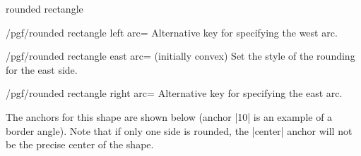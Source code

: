 \begin{shape}{rounded rectangle}
\begin{stylekey}{/pgf/rounded rectangle left arc=}
	Alternative key for specifying the west arc.
\end{stylekey}

\begin{key}{/pgf/rounded rectangle east arc= (initially convex)}
	Set the style of the rounding for the east side.
\end{key}

\begin{stylekey}{/pgf/rounded rectangle right arc=}
	Alternative key for specifying the east arc.
\end{stylekey}

	The anchors for this shape are shown below (anchor |10| is an example
	of a border angle). Note that if only one side is rounded, the 
	|center| anchor will not be the precise center of the shape.
	
\begin{codeexample}[]
\Huge
{}
\end{codeexample}

\end{shape}


